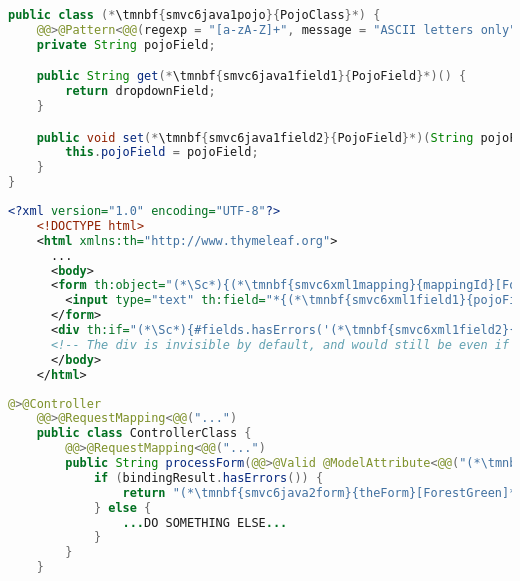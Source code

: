 \enlargethispage{10mm}
\thispagestyle{empty}
\begin{lstlisting}[language=Java, title={POJO class with restricted String field}]
public class (*\tmnbf{smvc6java1pojo}{PojoClass}*) {
    @@>@Pattern<@@(regexp = "[a-zA-Z]+", message = "ASCII letters only")
    private String pojoField;

    public String get(*\tmnbf{smvc6java1field1}{PojoField}*)() {
        return dropdownField;
    }

    public void set(*\tmnbf{smvc6java1field2}{PojoField}*)(String pojoField) {
        this.pojoField = pojoField;
    }
}
\end{lstlisting}
\begin{lstlisting}[language=XML, title={HTML form \tmnbf{smvc6xml1form}{\textit{theForm}}\textit{.html} setting the field}]
    <?xml version="1.0" encoding="UTF-8"?>
    <!DOCTYPE html>
    <html xmlns:th="http://www.thymeleaf.org">
      ...
      <body>
      <form th:object="(*\Sc*){(*\tmnbf{smvc6xml1mapping}{mappingId}[ForestGreen]*)}" ...>
        <input type="text" th:field="*{(*\tmnbf{smvc6xml1field1}{pojoField}[ForestGreen]*)}">
      </form>
      <div th:if="(*\Sc*){#fields.hasErrors('(*\tmnbf{smvc6xml1field2}{pojoField}[ForestGreen]*)')}" th:errors="*{(*\tmnbf{smvc6xml1field3}{pojoField}[ForestGreen]*)}"/>
      <!-- The div is invisible by default, and would still be even if it had some content -->
      </body>
    </html>
\end{lstlisting}
\begin{lstlisting}[language=Java, title={Controller processing the form}]
    @>@Controller
    @@>@RequestMapping<@@("...")
    public class ControllerClass {
        @@>@RequestMapping<@@("...")
        public String processForm(@@>@Valid @ModelAttribute<@@("(*\tmnbf{smvc6java2mapping}{mappingId}[ForestGreen]*)") (*\tmnbf{smvc6java2pojo}{PojoClass}*) pojo, BindingResult bindingResult) {
            if (bindingResult.hasErrors()) {
                return "(*\tmnbf{smvc6java2form}{theForm}[ForestGreen]*)";
            } else {
                ...DO SOMETHING ELSE...
            }
        }
    }
\end{lstlisting}
\newpage

